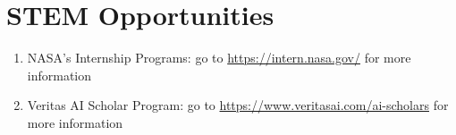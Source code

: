 \documentclass[11pt]{article}
\begin{document}
    \section{STEM Opportunities}
      \begin{enumerate}
          \item NASA's Internship Programs: go to \underline{https://intern.nasa.gov/} for more information
          \item Veritas AI Scholar Program: go to \underline{https://www.veritasai.com/ai-scholars} for more information
      \end{enumerate}
\end{document}
